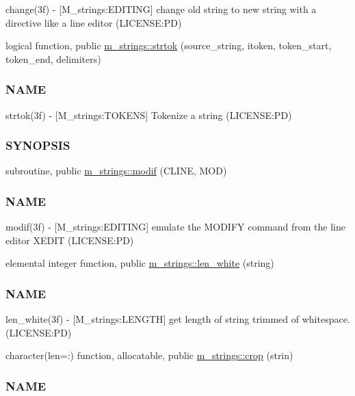 \begin{DoxyCompactItemize}
\begin{DoxyCompactList}
change(3f) -\/ \mbox{[}M\+\_\+strings\+:E\+D\+I\+T\+I\+NG\mbox{]} change old string to new string with a directive like a line editor (L\+I\+C\+E\+N\+SE\+:PD) \end{DoxyCompactList}\item 
logical function, public \mbox{\hyperlink{namespacem__strings_aa53af9135873e241c487a75a7073bda1}{m\+\_\+strings\+::strtok}} (source\+\_\+string, itoken, token\+\_\+start, token\+\_\+end, delimiters)
\begin{DoxyCompactList}\small\item\em \subsubsection*{N\+A\+ME}

strtok(3f) -\/ \mbox{[}M\+\_\+strings\+:T\+O\+K\+E\+NS\mbox{]} Tokenize a string (L\+I\+C\+E\+N\+SE\+:PD) \subsubsection*{S\+Y\+N\+O\+P\+S\+IS}\end{DoxyCompactList}\item 
subroutine, public \mbox{\hyperlink{namespacem__strings_aec887410b018916a683fbb2ae529f8c5}{m\+\_\+strings\+::modif}} (C\+L\+I\+NE, M\+OD)
\begin{DoxyCompactList}\small\item\em \subsubsection*{N\+A\+ME}

modif(3f) -\/ \mbox{[}M\+\_\+strings\+:E\+D\+I\+T\+I\+NG\mbox{]} emulate the M\+O\+D\+I\+FY command from the line editor X\+E\+D\+IT (L\+I\+C\+E\+N\+SE\+:PD) \end{DoxyCompactList}\item 
elemental integer function, public \mbox{\hyperlink{namespacem__strings_aa1427d5dd673ff986236ba1732e693c1}{m\+\_\+strings\+::len\+\_\+white}} (string)
\begin{DoxyCompactList}\small\item\em \subsubsection*{N\+A\+ME}

len\+\_\+white(3f) -\/ \mbox{[}M\+\_\+strings\+:L\+E\+N\+G\+TH\mbox{]} get length of string trimmed of whitespace. (L\+I\+C\+E\+N\+SE\+:PD) \end{DoxyCompactList}\item 
character(len=\+:) function, allocatable, public \mbox{\hyperlink{namespacem__strings_a7030d33ae9e65d8cf2e2cb9332ffdac0}{m\+\_\+strings\+::crop}} (strin)
\begin{DoxyCompactList}\small\item\em \subsubsection*{N\+A\+ME}


\end{DoxyCompactList}
\end{DoxyCompactItemize}
